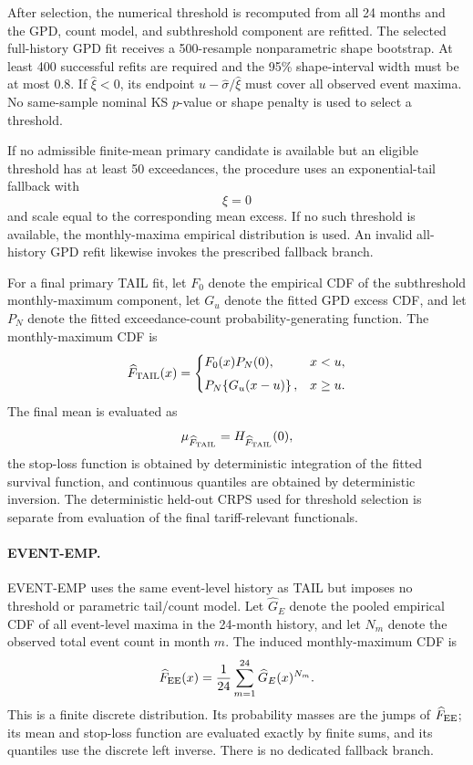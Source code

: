 \documentclass[]{interact}
\begin{document}
After selection, the numerical threshold is recomputed from all 24
months and the GPD, count model, and subthreshold component are refitted.
The selected full-history GPD fit receives a 500-resample nonparametric
shape bootstrap. At least 400 successful refits are required and the
95\% shape-interval width must be at most 0.8. If $\widehat\xi<0$,
its endpoint $u-\widehat\sigma/\widehat\xi$ must cover all observed
event maxima. No same-sample nominal KS $p$-value or shape penalty is
used to select a threshold.

If no admissible finite-mean primary candidate is available but an
eligible threshold has at least 50 exceedances, the procedure uses an
exponential-tail fallback with
\[
\xi=0
\]
and scale equal to the corresponding mean excess. If no such threshold
is available, the monthly-maxima empirical distribution is used.
An invalid all-history GPD refit likewise invokes the prescribed
fallback branch.

For a final primary TAIL fit, let \(F_0\) denote the empirical CDF of
the subthreshold monthly-maximum component, let \(G_u\) denote the
fitted GPD excess CDF, and let \(P_N\) denote the fitted exceedance-count
probability-generating function. The monthly-maximum CDF is
\[
\widehat F_{\rm TAIL}(x)
=
\begin{cases}
F_0(x)P_N(0),
&
x<u,
\\[4pt]
P_N\!\left\{G_u(x-u)\right\},
&
x\geq u.
\end{cases}
\]
The final mean is evaluated as
\[
\mu_{\widehat F_{\rm TAIL}}
=
H_{\widehat F_{\rm TAIL}}(0),
\]
the stop-loss function is obtained by deterministic integration of the
fitted survival function, and continuous quantiles are obtained by
deterministic inversion. The deterministic held-out CRPS used for threshold selection is
separate from evaluation of the final tariff-relevant functionals.



\paragraph*{EVENT-EMP.}

EVENT-EMP uses the same event-level history as TAIL but imposes no
threshold or parametric tail/count model. Let \(\widehat G_E\) denote
the pooled empirical CDF of all event-level maxima in the 24-month
history, and let \(N_m\) denote the observed total event count in
month \(m\). The induced monthly-maximum CDF is
\[
\widehat F_{\rm EE}(x)
=
\frac{1}{24}
\sum_{m=1}^{24}
\widehat G_E(x)^{N_m}.
\]
This is a finite discrete distribution. Its probability masses are the
jumps of \(\widehat F_{\rm EE}\); its mean and stop-loss function are
evaluated exactly by finite sums, and its quantiles use the discrete
left inverse. There is no dedicated fallback branch.
\end{document}
